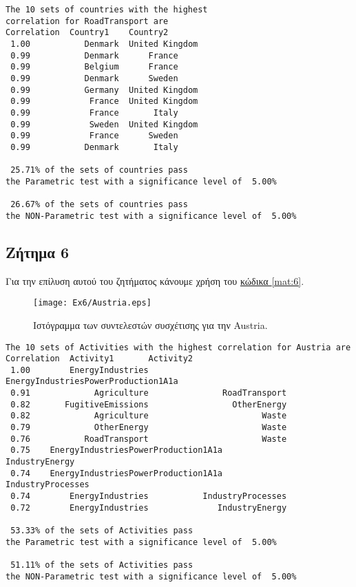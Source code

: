 \documentclass[11pt]{scrartcl} %
\begin{document}
\begin{Verbatim}[fontsize=\small]
The 10 sets of countries with the highest 
correlation for RoadTransport are
Correlation	 Country1	 Country2
 1.00	 	    Denmark	 United Kingdom 
 0.99	 	    Denmark	     France 
 0.99	 	    Belgium	     France 
 0.99	 	    Denmark	     Sweden 
 0.99	 	    Germany	 United Kingdom 
 0.99	 	     France	 United Kingdom 
 0.99	 	     France	      Italy 
 0.99	 	     Sweden	 United Kingdom 
 0.99	 	     France	     Sweden 
 0.99	 	    Denmark	      Italy 

 25.71% of the sets of countries pass 
the Parametric test with a significance level of  5.00%

 26.67% of the sets of countries pass 
the NON-Parametric test with a significance level of  5.00%
\end{Verbatim}











\subsection{Ζήτημα 6}
\label{subsec:z6}

Για την επίλυση αυτού του ζητήματος κάνουμε χρήση του \hyperref[mat:6]{κώδικα \ref*{mat:6}}.

\begin{figure}[H]

	\centering
	\texttt{[image: Ex6/Austria.eps]}	
\caption{Ιστόγραμμα των συντελεστών συσχέτισης για την Austria.}
\label{fig:z61} 
\end{figure}



\begin{Verbatim}[fontsize=\small]
The 10 sets of Activities with the highest correlation for Austria are
Correlation	 Activity1	 	 Activity2
 1.00	     EnergyIndustries	 	 EnergyIndustriesPowerProduction1A1a 
 0.91	          Agriculture	 	        RoadTransport 
 0.82	    FugitiveEmissions	 	          OtherEnergy 
 0.82	          Agriculture	 	                Waste 
 0.79	          OtherEnergy	 	                Waste 
 0.76	        RoadTransport	 	                Waste 
 0.75	 EnergyIndustriesPowerProduction1A1a	 	       IndustryEnergy 
 0.74	 EnergyIndustriesPowerProduction1A1a	 	    IndustryProcesses 
 0.74	     EnergyIndustries	 	    IndustryProcesses 
 0.72	     EnergyIndustries	 	       IndustryEnergy 

 53.33% of the sets of Activities pass 
the Parametric test with a significance level of  5.00%

 51.11% of the sets of Activities pass 
the NON-Parametric test with a significance level of  5.00%
\end{Verbatim}
\end{document}
